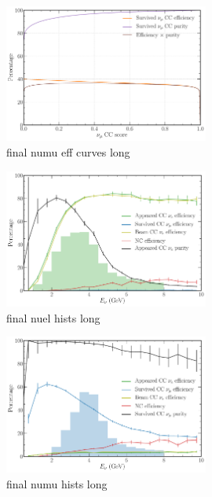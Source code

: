 \begin{figure} %
    \includegraphics[width=0.6\textwidth]{diagrams/7-cvn/chipsnet/final_numu_eff_curves.pdf}
    \caption[final numu eff curves short]
    {final numu eff curves long}
    \label{fig:final_numu_eff_curves}
\end{figure}

\begin{figure} %
    \includegraphics[width=0.6\textwidth]{diagrams/7-cvn/chipsnet/final_nuel_hists.pdf}
    \caption[final nuel hists short]
    {final nuel hists long}
    \label{fig:final_nuel_hists}
\end{figure}

\begin{figure} %
    \includegraphics[width=0.6\textwidth]{diagrams/7-cvn/chipsnet/final_numu_hists.pdf}
    \caption[final numu hists short]
    {final numu hists long}
    \label{fig:final_numu_hists}
\end{figure}

